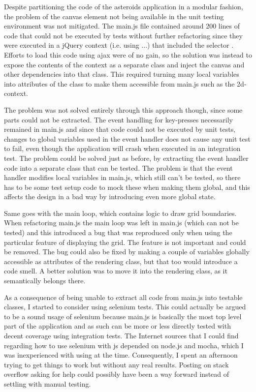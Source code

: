 \documentclass[11pt]{article}
\begin{document}
Despite partitioning the code of the asteroids application in a modular fashion, the problem of the canvas element not being available in the unit testing environment was not mitigated. The main.js file contained around 200 lines of code that could not be executed by tests without further refactoring since they were executed in a jQuery context (i.e. using \jquerycontext...) that included the selector \selector. Efforts to load this code using ajax were of no gain, so the solution was instead to expose the contents of the context as a separate class and inject the canvas and other dependencies into that class. This required turning many local variables into attributes of the class to make them accessible from main.js such as the 2d-context.

The problem was not solved entirely through this approach though, since some parts could not be extracted. The event handling for key-presses necessarily remained in main.js and since that code could not be executed by unit tests, changes to global variables used in the event handler does not cause any unit test to fail, even though the application will crash when executed in an integration test. The problem could be solved just as before, by extracting the event handler code into a separate class that can be tested. The problem is that the event handler modifies local variables in main.js, which still can't be tested, so there has to be some test setup code to mock these when making them global, and this affects the design in a bad way by introducing even more global state.

Same goes with the main loop, which contains logic to draw grid boundaries. When refactoring main.js the main loop was left in main.js (which can not be tested) and this introduced a bug that was reproduced only when using the particular feature of displaying the grid. The feature is not important and could be removed. The bug could also be fixed by making a couple of variables globally accessible as attributes of the rendering class, but that too would introduce a code smell. A better solution was to move it into the rendering class, as it semantically belongs there.

As a consequence of being unable to extract all code from main.js into testable classes, I started to consider using selenium tests. This could actually be argued to be a sound usage of selenium because main.js is basically the most top level part of the application and as such can be more or less directly tested with decent coverage using integration tests. The Internet sources that I could find regarding how to use selenium with \gls{js} depended on node.js and mocha, which I was inexperienced with using at the time. Consequently, I spent an afternoon trying to get things to work but without any real results. Posting on stack overflow asking for help could possibly have been a way forward instead of settling with manual testing.
\end{document}
